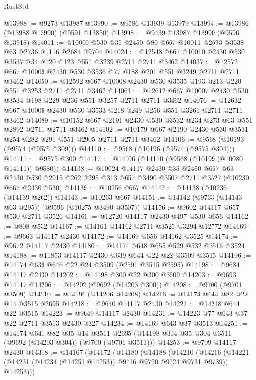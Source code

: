 \begin{lexlean}{RustStd}
\begin{coremodule}
@13988 := @9273 @13987
@13990 := @9586 @13939 @13979
@13994 := @13986 (@13988 @13990) (@9591 @13850)
@13998 := @9439 @13987 @13990 (@9596 @13918)
@14011 := @10000 @530 @35 @2450 @80 @667 @10011 @2693 @3538 @63 @2736 @1116 @2684 @9704
@14024 := @12548 @667 @10010 @2430 @530 @3537 @34 @120 @123 @551 @3239 @2711 @2711 @3462
@14037 := @12572 @667 @10009 @2430 @530 @3536 @77 @188 @201 @551 @3249 @2711 @2711 @3462
@14050 := @12592 @667 @10008 @2430 @530 @3535 @193 @213 @220 @551 @3253 @2711 @2711 @3462
@14063 := @12612 @667 @10007 @2430 @530 @3534 @198 @229 @236 @551 @3257 @2711 @2711 @3462
@14076 := @12632 @667 @10006 @2430 @530 @3533 @218 @249 @256 @551 @3261 @2711 @2711 @3462
@14089 := @10152 @667 @2191 @2430 @530 @3532 @234 @273 @63 @551 @2892 @2711 @2711 @3462
@14102 := @10179 @667 @2190 @2430 @530 @3531 @254 @282 @291 @551 @2905 @2711 @2711 @3462
@14106 := @9568 (@10193 (@9574 (@9575 @309)))
@14110 := @9568 (@10196 (@9574 (@9575 @304)))
@14111 := @9575 @300
@14117 := @14106 (@14110 (@9568 (@10199 (@10080 @14111)) @9580))
@14138 := @10024
    @14117
    @2430
    @35
    @2450
    @667
    @63
    @2430
    @530
    @2915
    @262
    @295
    @313
    @657
    @3490
    @3507
    @2711
    @3527
    (@10230 @667 @2430 @530)
@14139 := @10256 @667
@14142 := @14138 (@10236 (@14139 @262))
@14143 := @10263 @667
@14151 := @14142 (@9733 (@14143 @63 @295)) (@9596 (@10275 @3490 @3507))
@14156 := @9602 @14117 @657 @530 @2711 @3526
@14161 := @12720 @14117 @2430 @497 @530 @656
@14162 := @808 @532
@14167 := @14161 @14162 @2711 @3525 @3294 @12772
@14169 := @9663 @14117 @2430
@14172 := @14169 @656 @14162 @3525
@14174 := @9672 @14117 @2430
@14180 := @14174 @648 @655 @529 @532 @3516 @3524
@14188 := @11853 @14117 @2430 @639 @644 @22 @22 @3509 @3515
@14196 := @14174 @639 @646 @22 @24 @3509 (@2691 @3515 @2695)
@14198 := @9684 @14117 @2430
@14202 := @14198 @300 @22 @300 @3509
@14203 := @9693 @14117
@14206 := @14202 (@9692 (@14203 @300))
@14208 := @9700 (@9701 @3509)
@14210 := @14196 (@14206 @14208)
@14216 := @14174 @644 @82 @22 @14 @3515 @2695
@14218 := @9640 @14117 @2430
@14221 := @14218 @644 @22 @3515
@14223 := @9649 @14117 @2430
@14231 := @14223 @77 @643 @37 @22 @2711 @3513 @2430 @327
@14234 := @14169 @643 @37 @3513
@14251 := @14174
    @641
    @82
    @35
    @14
    @3511
    @2695
    (@14198 @304 @35 @304 @3511 (@9692 (@14203 @304)) (@9700 (@9701 @3511)))
@14253 := @9709 @14117 @2430
@14318 := @14167
    (@14172
      (@14180
        (@14188
          (@14210
            (@14216
              (@14221 (@14231 (@14234 (@14251 @14253)) @9716 @9720 @9724 @9731 @9739))
              @14253)))

\end{coremodule}
\end{lexlean}
